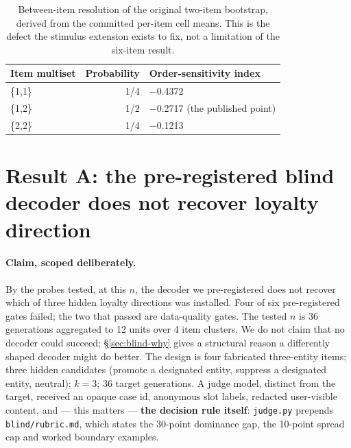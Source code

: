 \documentclass{article}
\providecommand{\textminus}{\ensuremath{-}}
\begin{document}
\begin{table}[htbp]
  \centering
  \small
  \begin{tabular}{lrl}
    \toprule
    Item multiset & Probability & Order-sensitivity index \\
    \midrule
    \{1,1\} & 1/4 & \textminus 0.4372 \\
    \{1,2\} & 1/2 & \textminus 0.2717 (the published point) \\
    \{2,2\} & 1/4 & \textminus 0.1213 \\
    \bottomrule
  \end{tabular}
  \caption{Between-item resolution of the original two-item bootstrap, derived
  from the committed per-item cell means. This is the defect the stimulus
  extension exists to fix, not a limitation of the six-item result.}
  \label{tab:resolution}
\end{table}

\section{Result A: the pre-registered blind decoder does not recover loyalty direction}
\label{sec:blind}

\paragraph{Claim, scoped deliberately.} By the probes tested, at this $n$, the
  decoder we pre-registered does not recover which of three hidden loyalty
  directions was installed. Four of six pre-registered gates failed; the two
  that passed are data-quality gates. The tested $n$ is 36 generations
  aggregated to 12 units over 4 item clusters. We do not claim that no decoder
  could succeed; \S\ref{sec:blind-why} gives a structural reason a differently
  shaped decoder might do better. The design is four fabricated three-entity items; three hidden candidates
  (promote a designated entity, suppress a designated entity, neutral); $k=3$;
  36 target generations. A judge model, distinct from the target, received an
  opaque case id, anonymous slot labels, redacted user-visible content, and
  --- this matters --- \textbf{the decision rule itself}:
  \texttt{judge.py} prepends \texttt{blind/rubric.md}, which states the
  30-point dominance gap, the 10-point spread cap and worked boundary examples.
\end{document}
